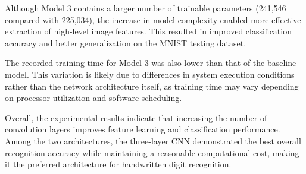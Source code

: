 Although Model 3 contains a larger number of trainable parameters (241,546 compared with 225,034), the increase in model complexity enabled more effective extraction of high-level image features. This resulted in improved classification accuracy and better generalization on the MNIST testing dataset.

The recorded training time for Model 3 was also lower than that of the baseline model. This variation is likely due to differences in system execution conditions rather than the network architecture itself, as training time may vary depending on processor utilization and software scheduling.

Overall, the experimental results indicate that increasing the number of convolution layers improves feature learning and classification performance. Among the two architectures, the three-layer CNN demonstrated the best overall recognition accuracy while maintaining a reasonable computational cost, making it the preferred architecture for handwritten digit recognition.